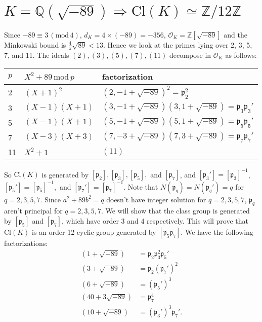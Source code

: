\documentclass{article}
\newcommand{\Cl}{\mathrm{Cl}}
\newcommand{\Mod}[1]{\,(\mathrm{mod}\,#1)}
\begin{document}
\section{$K = \mathbb{Q}(\sqrt{-89})\Rightarrow \Cl(K) \simeq \mathbb{Z}/12\mathbb{Z}$}
Since $-89\equiv 3\Mod{4}$, $d_{K} = 4\times (-89) = -356$, $\mathcal{O}_{K} = \mathbb{Z}[\sqrt{-89}]$ and the Minkowski bound is $\frac{4}{\pi}\sqrt{89} < 13$. Hence we look at the primes lying over 2, 3, 5, 7, and 11. The ideals $(2), (3), (5), (7), (11)$ decompose in $\mathcal{O}_{K}$ as follows:
\begin{center}
\begin{tabular}{|l|l|l|}
\hline
$p$ & $X^{2} + 89 \,\mathrm{mod}\, p$ & factorization                         \\ \hline
2   & $(X+1)^{2}$                     & $(2, -1+\sqrt{-89})^{2} = \mathfrak{p}_{2}^{2}$              \\ \hline
3   & $(X-1)(X+1)$                    & $(3, -1+\sqrt{-89})(3, 1+\sqrt{-89}) = \mathfrak{p}_{3}\mathfrak{p}_{3}'$ \\ \hline
5   & $(X-1)(X+1)$                    & $(5, -1+\sqrt{-89})(5, 1+\sqrt{-89}) = \mathfrak{p}_{5}\mathfrak{p}_{5}'$ \\ \hline
7   & $(X-3)(X+3)$                    & $(7, -3+\sqrt{-89})(7, 3+\sqrt{-89}) = \mathfrak{p}_{7}\mathfrak{p}_{7}'$ \\ \hline
11  & $X^{2} + 1$                     & $(11)$                                \\ \hline
\end{tabular}
\end{center}
So $\Cl(K)$ is generated by $[\mathfrak{p}_{2}], [\mathfrak{p}_{3}], [\mathfrak{p}_{5}],$ and $[\mathfrak{p}_{7}]$, and $[\mathfrak{p}_{3}'] = [\mathfrak{p}_{3}]^{-1}$, $[\mathfrak{p}_{5}'] = [\mathfrak{p}_{5}]^{-1},$ and $[\mathfrak{p}_{7}'] = [\mathfrak{p}_{7}]^{-1}$. Note that $N(\mathfrak{p}_{q}) = N(\mathfrak{p}_{q}') = q$ for $q = 2, 3, 5, 7$. Since $a^{2} + 89b^{2} = q$ doesn't have integer solution for $q = 2, 3, 5, 7$, $\mathfrak{p}_{q}$ aren't principal for $q = 2, 3, 5, 7$. 
We will show that the class group is generated by $[\mathfrak{p}_{5}]$ and $[\mathfrak{p}_{7}]$, which have order 3 and 4 respectively. This will prove that  $\Cl(K)$ is an order 12 cyclic group generated by $[\mathfrak{p}_{5}\mathfrak{p}_{7}]$. We have the following factorizations:
\begin{align*}
(1+\sqrt{-89}) &= \mathfrak{p}_{2}\mathfrak{p}_{3}^{2}\mathfrak{p}_{5}' \\
(3+\sqrt{-89}) &= \mathfrak{p}_{2}(\mathfrak{p}_{7}')^{2} \\
(6 + \sqrt{-89}) &= (\mathfrak{p}_{5}')^{3} \\
(40 + 3 \sqrt{-89}) &= \mathfrak{p}_{7}^{4} \\
(10+\sqrt{-89}) &= (\mathfrak{p}_{3}')^{3}\mathfrak{p}_{7}'.
\end{align*}
\end{document}
